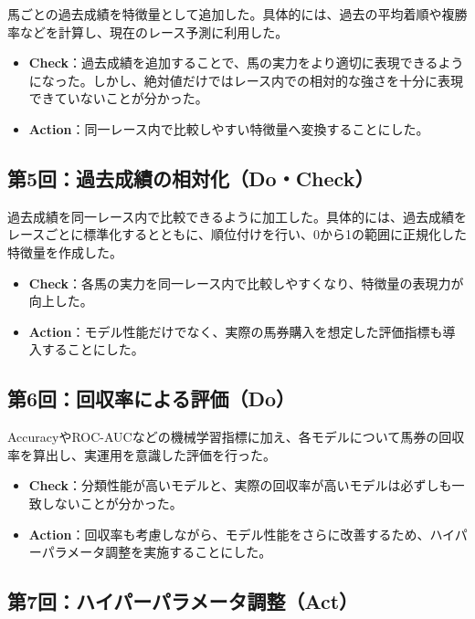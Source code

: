 \documentclass[dvipdfmx, a4paper, 11pt, titlepage]{jsarticle}
\begin{document}
馬ごとの過去成績を特徴量として追加した。具体的には、過去の平均着順や複勝率などを計算し、現在のレース予測に利用した。

\begin{itemize}
    \item \textbf{Check}：過去成績を追加することで、馬の実力をより適切に表現できるようになった。しかし、絶対値だけではレース内での相対的な強さを十分に表現できていないことが分かった。
    \item \textbf{Action}：同一レース内で比較しやすい特徴量へ変換することにした。
\end{itemize}

\subsection{第5回：過去成績の相対化（Do・Check）}

過去成績を同一レース内で比較できるように加工した。具体的には、過去成績をレースごとに標準化するとともに、順位付けを行い、0から1の範囲に正規化した特徴量を作成した。

\begin{itemize}
    \item \textbf{Check}：各馬の実力を同一レース内で比較しやすくなり、特徴量の表現力が向上した。
    \item \textbf{Action}：モデル性能だけでなく、実際の馬券購入を想定した評価指標も導入することにした。
\end{itemize}

\subsection{第6回：回収率による評価（Do）}

AccuracyやROC-AUCなどの機械学習指標に加え、各モデルについて馬券の回収率を算出し、実運用を意識した評価を行った。

\begin{itemize}
    \item \textbf{Check}：分類性能が高いモデルと、実際の回収率が高いモデルは必ずしも一致しないことが分かった。
    \item \textbf{Action}：回収率も考慮しながら、モデル性能をさらに改善するため、ハイパーパラメータ調整を実施することにした。
\end{itemize}

\subsection{第7回：ハイパーパラメータ調整（Act）}
\end{document}
